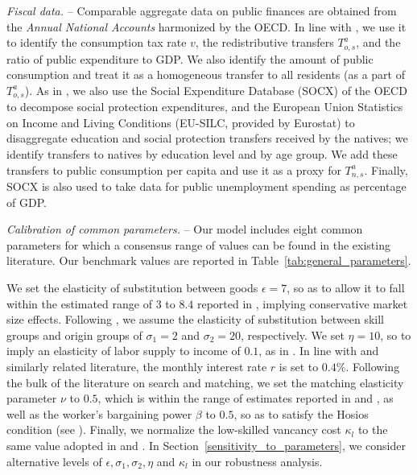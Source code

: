 \documentclass[a4paper,12pt]{article}
\begin{document}
\emph{Fiscal data.} -- Comparable aggregate data on public finances are obtained from the \textit{Annual National Accounts} harmonized by the OECD. In line with \citet{Burzynski2018}, we use it to identify the consumption tax rate $v$, the redistributive transfers $T^a_{o,s}$, and the ratio of public expenditure to GDP. We  also  identify  the  amount  of  public  consumption  and  treat  it  as a  homogeneous  transfer  to  all  residents  (as  a  part  of $T^a_{o,s}$). As in \citet{Aubry2016},  we also use the Social Expenditure Database (SOCX) of the OECD to decompose social protection expenditures, and the European Union Statistics on Income and Living Conditions (EU-SILC, provided by Eurostat) to disaggregate education and social protection transfers received by the natives; we identify transfers to natives by education level and by age group. We add these transfers to public consumption per capita and  use  it  as  a  proxy  for $T^a_{n,s}$. Finally, SOCX is also used to take data for public unemployment spending as percentage of GDP.

\emph{Calibration of common parameters.} -- Our model includes eight common parameters for which a consensus range of values can be found in the existing literature. Our benchmark values are reported in Table~\ref{tab:general_parameters}.

We set the elasticity of substitution between goods $\epsilon=7$, so as to allow it to fall within the estimated range of $3$ to $8.4$ reported in \citet{Feenstra1994}, implying conservative market size effects. Following \citet{Ottaviano2012}, we assume the elasticity of substitution between skill groups and origin groups of $\sigma_1 =2$ and $\sigma_2 =20$, respectively. We set $\eta=10$, so to imply an elasticity of labor supply to income of $0.1$, as in \citet{Evers2008}. In line with \citet{Chassamboulli2014} and similarly related literature, the monthly interest rate $r$ is set to $0.4\%$. Following the bulk of the literature on search and matching, we set the matching elasticity parameter $\nu$ to $0.5$, which is within the range of estimates reported in \citet{Petrongolo2001} and \citet{Mortensen2007}, as well as the worker's bargaining power $\beta$ to $0.5$, so as to satisfy the Hosios condition (see \citet{Hosios1990}). Finally, we normalize the low-skilled vancancy cost $\kappa_l$ to the same value adopted in \citet{Chassamboulli2014} and \citet{Battisti2018}. In Section~\ref{sensitivity_to_parameters}, we consider alternative levels of $\epsilon, \sigma_1,\sigma_2, \eta$ and $\kappa_l$ in our robustness analysis.
\end{document}
